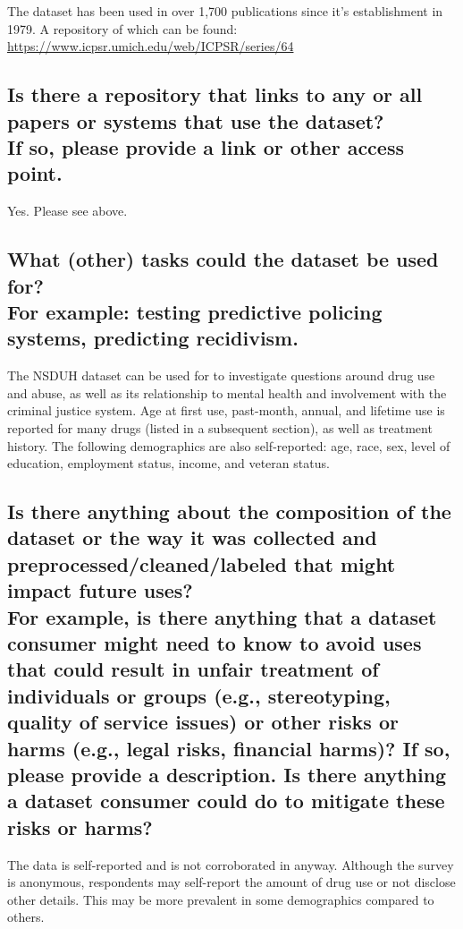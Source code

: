 \documentclass[letterpaper, 10 pt, conference]{ieeeconf}  %
\newcommand{\subtitle}[1]{{\\ \small \normalfont \color{purple} #1}}
\begin{document}
The dataset has been used in over 1,700 publications since it's establishment in 1979. A repository of which can be found: \\

\href{https://www.icpsr.umich.edu/web/ICPSR/series/64}{https://www.icpsr.umich.edu/web/ICPSR/series/64}

\subsection{Is there a repository that links to any or all papers or systems that use the dataset? \subtitle{If so, please provide a link or other access point. }}

Yes. Please see above. 

\subsection{What (other) tasks could the dataset be used for? \subtitle{For example: testing predictive policing systems, predicting recidivism.}}

The NSDUH dataset can be used for to investigate questions around drug use and abuse, as well as its relationship to mental health and involvement with the criminal justice system.  Age at first use, past-month, annual, and lifetime use is reported for many drugs (listed in a subsequent section), as well as treatment history. The following demographics are also self-reported: age, race, sex, level of education, employment status, income, and veteran status.

\subsection{Is there anything about the composition of the dataset or the way it was collected and preprocessed/cleaned/labeled that might impact future uses? \subtitle{For example, is there anything that a dataset consumer might need to know to avoid uses that could result in unfair treatment of individuals or groups (e.g., stereotyping, quality of service issues) or other risks or harms (e.g., legal risks, financial harms)? If so, please provide a description. Is there anything a dataset consumer could do to mitigate these risks or harms?}}

The data is self-reported and is not corroborated in anyway. Although the survey is anonymous, respondents may self-report the amount of drug use or not disclose other details. This may be more prevalent in some demographics compared to others.
\end{document}
